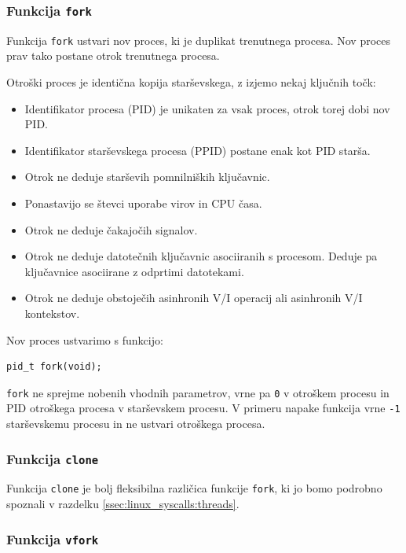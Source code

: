 \documentclass[a4paper,12pt,openright]{book}
\begin{document}
\subsubsection{Funkcija \texttt{fork}}

Funkcija \texttt{fork} ustvari nov proces, ki je duplikat trenutnega procesa.
Nov proces prav tako postane otrok trenutnega procesa.

Otroški proces je identična kopija starševskega, z izjemo nekaj ključnih točk:
\begin{itemize}
	\item Identifikator procesa (PID) je unikaten za vsak proces, otrok torej dobi nov PID.
	\item Identifikator starševskega procesa (PPID) postane enak kot PID starša.
	\item Otrok ne deduje starševih pomnilniških ključavnic.
	\item Ponastavijo se števci uporabe virov in CPU časa.
	\item Otrok ne deduje čakajočih signalov.
	\item Otrok ne deduje datotečnih ključavnic asociiranih s procesom. Deduje pa ključavnice asociirane z odprtimi datotekami.
	\item Otrok ne deduje obstoječih asinhronih V/I operacij ali asinhronih V/I kontekstov.
\end{itemize}

Nov proces ustvarimo s funkcijo:
\begin{lstlisting}[style=func]
 pid_t fork(void);
\end{lstlisting}

\texttt{fork} ne sprejme nobenih vhodnih parametrov, vrne pa \texttt{0} v otroškem procesu in PID otroškega procesa v starševskem procesu.
V primeru napake funkcija vrne \texttt{-1} starševskemu procesu in ne ustvari otroškega procesa.

\subsubsection{Funkcija \texttt{clone}}

Funkcija \texttt{clone} je bolj fleksibilna različica funkcije \texttt{fork}, ki jo bomo podrobno spoznali v razdelku \ref{ssec:linux_syscalls:threads}.

\subsubsection{Funkcija \texttt{vfork}}
\end{document}
